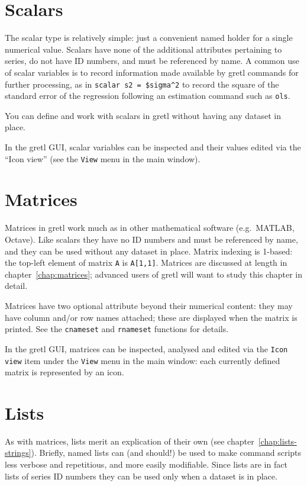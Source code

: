 \section{Scalars}
\label{sec:Scalars}

The scalar type is relatively simple: just a convenient named holder
for a single numerical value. Scalars have none of the additional
attributes pertaining to series, do not have ID numbers, and must be
referenced by name. A common use of scalar variables is to record
information made available by gretl commands for further processing,
as in \texttt{scalar s2 = \$sigma\^{}2} to record the square of the
standard error of the regression following an estimation command such
as \texttt{ols}.

You can define and work with scalars in gretl without having any
dataset in place.

In the gretl GUI, scalar variables can be inspected and their values
edited via the ``Icon view'' (see the \texttt{View} menu in the main
window).

\section{Matrices}
\label{sec:Matrices}

Matrices in gretl work much as in other mathematical software (e.g.\
\textsf{MATLAB}, \textsf{Octave}). Like scalars they have no ID
numbers and must be referenced by name, and they can be used without
any dataset in place. Matrix indexing is 1-based: the top-left element
of matrix \texttt{A} is \texttt{A[1,1]}.  Matrices are discussed at
length in chapter~\ref{chap:matrices}; advanced users of gretl will
want to study this chapter in detail.

Matrices have two optional attribute beyond their numerical content:
they may have column and/or row names attached; these are displayed
when the matrix is printed. See the \texttt{cnameset} and
\texttt{rnameset} functions for details.

In the gretl GUI, matrices can be inspected, analysed and edited via
the \texttt{Icon view} item under the \texttt{View} menu in the main
window: each currently defined matrix is represented by an icon.

\section{Lists}
\label{sec:Lists}

As with matrices, lists merit an explication of their own (see
chapter~\ref{chap:lists-strings}).  Briefly, named lists can (and
should!)  be used to make command scripts less verbose and
repetitious, and more easily modifiable. Since lists are in fact lists
of series ID numbers they can be used only when a dataset is in place.

